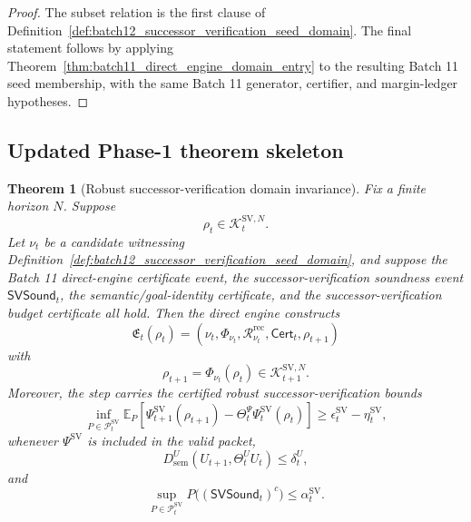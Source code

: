 \documentclass[11pt]{article}
\newtheorem{theorem}{Theorem}[section]
\newcommand{\Pcal}{\mathcal{P}}
\newcommand{\Rcal}{\mathcal{R}}
\newcommand{\1}{\mathbf{1}}
\providecommand{\Kcal}{\mathcal{K}}
\providecommand{\sem}{\mathrm{sem}}
\begin{document}
\begin{proof}
The subset relation is the first clause of Definition~\ref{def:batch12_successor_verification_seed_domain}.  The final statement follows by applying Theorem~\ref{thm:batch11_direct_engine_domain_entry} to the resulting Batch 11 seed membership, with the same Batch 11 generator, certifier, and margin-ledger hypotheses.
\end{proof}

\subsection{Updated Phase-1 theorem skeleton}

\begin{theorem}[Robust successor-verification domain invariance]
\label{thm:batch12_robust_successor_verification_domain_invariance}
Fix a finite horizon \(N\).  Suppose
\[
\rho_t\in\Kcal_t^{\mathrm{SV},N}.
\]
Let \(\nu_t\) be a candidate witnessing Definition~\ref{def:batch12_successor_verification_seed_domain}, and suppose the Batch 11 direct-engine certificate event, the successor-verification soundness event \(\mathsf{SVSound}_t\), the semantic/goal-identity certificate, and the successor-verification budget certificate all hold.  Then the direct engine constructs
\[
\mathfrak E_t(\rho_t)
=
(\nu_t,\Phi_{\nu_t},\Rcal_{\nu_t}^{\mathrm{rec}},\mathsf{Cert}_t,\rho_{t+1})
\]
with
\[
\rho_{t+1}=\Phi_{\nu_t}(\rho_t)
\in
\Kcal_{t+1}^{\mathrm{SV},N}.
\]
Moreover, the step carries the certified robust successor-verification bounds
\[
\inf_{P\in\Pcal_t^{\mathrm{SV}}}
\mathbb E_P
\left[
\Psi_{t+1}^{\mathrm{SV}}(\rho_{t+1})
-
\Theta_t^\Psi \Psi_t^{\mathrm{SV}}(\rho_t)
\right]
\ge
\epsilon_t^{\mathrm{SV}}-
\eta_t^{\mathrm{SV}},
\]
whenever \(\Psi^{\mathrm{SV}}\) is included in the valid packet,
\[
D_{\sem}^U(U_{t+1},\Theta_t^U U_t)
\le
\delta_t^U,
\]
and
\[
\sup_{P\in\Pcal_t^{\mathrm{SV}}}
P\bigl((\mathsf{SVSound}_t)^c\bigr)
\le
\alpha_t^{\mathrm{SV}}.
\]
\end{theorem}
\end{document}
